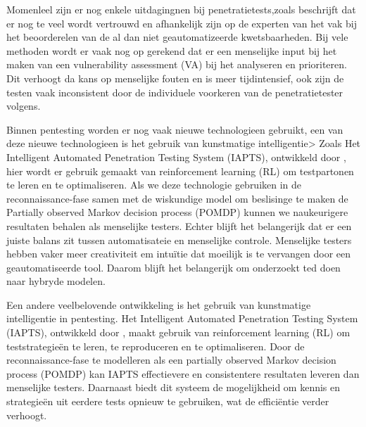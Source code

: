 Momenleel zijn er nog enkele uitdagingnen bij penetratietests,zoals \textcite{Fugkeaw} beschrijft dat er nog te veel wordt 
vertrouwd en afhankelijk zijn op de experten van het vak bij het beoorderelen van de al dan niet geautomatizeerde kwetsbaarheden. 
Bij vele methoden wordt er vaak nog op gerekend dat er een menselijke input bij het maken van een vulnerability assessment (VA) 
bij het analyseren en prioriteren. Dit verhoogt da kans op menselijke fouten en is meer tijdintensief, ook zijn de testen vaak 
inconsistent door de individuele voorkeren van de penetratietester volgens\textcite{Ghanem}.

Binnen pentesting worden er nog vaak nieuwe technologieen gebruikt, een van deze nieuwe technologieen is het gebruik van 
kunstmatige intelligentie> Zoals Het Intelligent Automated Penetration Testing System (IAPTS), ontwikkeld door \textcite{Ghanem},
hier wordt er gebruik gemaakt van reinforcement learning (RL) om testpartonen te leren en te optimaliseren. Als we deze technologie 
gebruiken in de reconnaissance-fase samen met de wiskundige model om beslisinge te maken de Partially observed Markov decision process (POMDP)
kunnen we naukeurigere resultaten behalen als menselijke testers.
Echter blijft het belangerijk dat er een juiste balans zit tussen automatisateie en menselijke controle. Menselijke testers hebben vaker 
meer creativiteit em intuïtie dat moeilijk is te vervangen door een geautomatiseerde tool. Daarom blijft het belangerijk om onderzoekt ted 
doen naar hybryde modelen.

Een andere veelbelovende ontwikkeling is het gebruik van kunstmatige intelligentie in pentesting. Het Intelligent Automated 
Penetration Testing System (IAPTS), ontwikkeld door \textcite{Ghanem}, maakt gebruik van reinforcement learning (RL) om 
teststrategieën te leren, te reproduceren en te optimaliseren. Door de reconnaissance-fase te modelleren als een partially observed 
Markov decision process (POMDP) kan IAPTS effectievere en consistentere resultaten leveren dan menselijke testers. Daarnaast biedt 
dit systeem de mogelijkheid om kennis en strategieën uit eerdere tests opnieuw te gebruiken, wat de efficiëntie verder verhoogt.\autocite{Ghanem}







